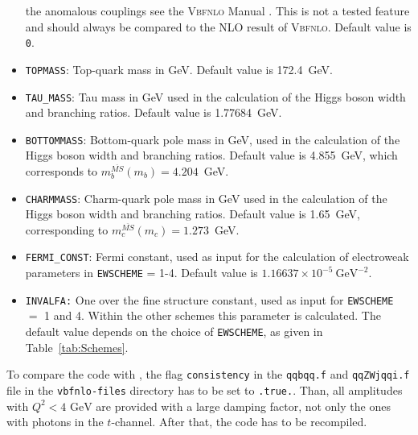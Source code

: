 \documentclass[a4paper,11pt]{article}
\begin{document}
\begin{itemize}
the anomalous couplings see the \textsc{Vbfnlo} Manual \cite{vbfnlo}. This is 
not a tested feature and should always be compared to the NLO result of 
\textsc{Vbfnlo}. Default value is {\tt 0}. 
\item {\tt TOPMASS}: Top-quark mass in GeV. Default value is 172.4~GeV. 
\item {\tt TAU\_MASS}: Tau mass in GeV used in the calculation of the Higgs boson
width and branching ratios. Default value is 1.77684~GeV. 
\item {\tt BOTTOMMASS}: Bottom-quark pole mass in GeV, used in the calculation
of the Higgs boson width and branching ratios. Default value is
4.855~GeV, which corresponds to $m_{b}^{\overline{MS}}(m_{b}) = 4.204$~GeV.
\item {\tt CHARMMASS}: Charm-quark pole mass in GeV used in the calculation of
the Higgs boson width and branching ratios. Default value is 1.65~GeV,
corresponding to $m_{c}^{\overline{MS}}(m_{c}) = 1.273$~GeV.
\item {\tt FERMI\_CONST}: Fermi constant, used as input for the calculation of
electroweak parameters in {\tt EWSCHEME} = 1-4. Default value is $1.16637 \times
10^{-5} \ \mathrm{GeV}^{-2}$. 
\item {\tt INVALFA:} One over the fine structure constant, used as input for
{\tt EWSCHEME} $=$ 1 and 4.  Within the other schemes this parameter is
calculated. The default value depends on the choice of {\tt EWSCHEME}, as given
in Table~\ref{tab:Schemes}.
\end{itemize} 
To compare the code with \cite{JSZ}, the flag {\tt consistency} in the {\tt qqbqq.f} and 
{\tt qqZWjqqi.f} file in the {\tt vbfnlo-files} directory has to be set to {\tt .true.}. 
Than, all amplitudes with $Q^2<4 \text{~GeV}$ are provided with a large damping factor, not 
only the ones with photons in the $t$-channel. After that, the code has to be recompiled. 
\end{document}
